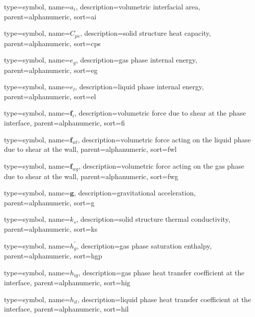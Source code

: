 

{
  type=symbol,
	name={\ensuremath{a_i}},
	description={volumetric interfacial area},
	parent=alphanumeric,
	sort={ai}
}

{
  type=symbol,
	name={\ensuremath{C_{ps}}},
	description={solid structure heat capacity},
	parent=alphanumeric,
	sort={cps}
}

{
  type=symbol,
	name={\ensuremath{e_g}},
	description={gas phase internal energy},
	parent=alphanumeric,
	sort={eg}
}

{
  type=symbol,
	name={\ensuremath{e_l}},
	description={liquid phase internal energy},
	parent=alphanumeric,
	sort={el}
}

{
  type=symbol,
	name={\ensuremath{\mathbf{f}_i}},
	description={volumetric force due to shear at the phase interface},
	parent=alphanumeric,
	sort={fi}
}

{
  type=symbol,
	name={\ensuremath{\mathbf{f}_{wl}}},
	description={volumetric force acting on the liquid phase due to shear at the wall},
	parent=alphanumeric,
	sort={fwl}
}

{
  type=symbol,
	name={\ensuremath{\mathbf{f}_{wg}}},
	description={volumetric force acting on the gas phase due to shear at the wall},
	parent=alphanumeric,
	sort={fwg}
}

{
  type=symbol,
	name={\ensuremath{\mathbf{g}}},
	description={gravitational acceleration},
	parent=alphanumeric,
	sort={g}
}

{
  type=symbol,
	name={\ensuremath{k_s}},
	description={solid structure thermal conductivity},
	parent=alphanumeric,
	sort={ks}
}

{
  type=symbol,
	name={\ensuremath{h^\prime_g}},
	description={gas phase saturation enthalpy},
	parent=alphanumeric,
	sort={hgp}
}

{
  type=symbol,
	name={\ensuremath{h_{ig}}},
	description={gas phase heat transfer coefficient at the interface},
	parent=alphanumeric,
	sort={hig}
}

{
  type=symbol,
	name={\ensuremath{h_{il}}},
	description={liquid phase heat transfer coefficient at the interface},
	parent=alphanumeric,
	sort={hil}
}

